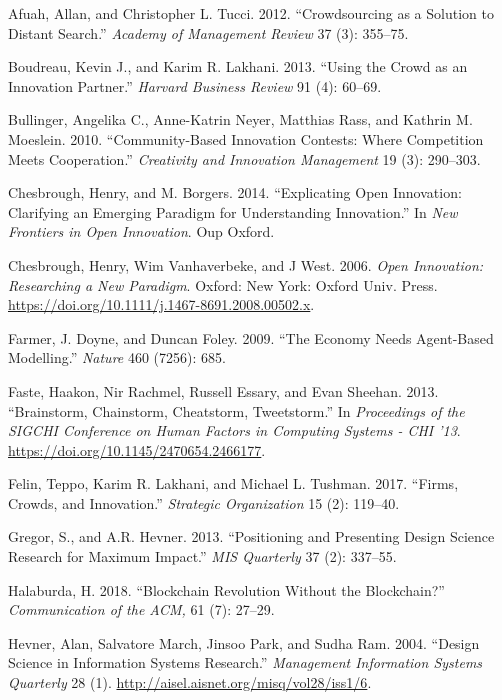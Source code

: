 \documentclass[]{elsarticle} %
\begin{document}
\hypertarget{refs}{}
\hypertarget{ref-afuah_crowdsourcing_2012}{}
Afuah, Allan, and Christopher L. Tucci. 2012. ``Crowdsourcing as a
Solution to Distant Search.'' \emph{Academy of Management Review} 37
(3): 355--75.

\hypertarget{ref-boudreau_using_2013}{}
Boudreau, Kevin J., and Karim R. Lakhani. 2013. ``Using the Crowd as an
Innovation Partner.'' \emph{Harvard Business Review} 91 (4): 60--69.

\hypertarget{ref-bullinger_community-based_2010-1}{}
Bullinger, Angelika C., Anne-Katrin Neyer, Matthias Rass, and Kathrin M.
Moeslein. 2010. ``Community-Based Innovation Contests: Where Competition
Meets Cooperation.'' \emph{Creativity and Innovation Management} 19 (3):
290--303.

\hypertarget{ref-chesbrough_explicating_2014}{}
Chesbrough, Henry, and M. Borgers. 2014. ``Explicating Open Innovation:
Clarifying an Emerging Paradigm for Understanding Innovation.'' In
\emph{New Frontiers in Open Innovation}. Oup Oxford.

\hypertarget{ref-chesbrough_open_2006}{}
Chesbrough, Henry, Wim Vanhaverbeke, and J West. 2006. \emph{Open
Innovation: Researching a New Paradigm}. Oxford: New York: Oxford Univ.
Press. \url{https://doi.org/10.1111/j.1467-8691.2008.00502.x}.

\hypertarget{ref-farmer_economy_2009}{}
Farmer, J. Doyne, and Duncan Foley. 2009. ``The Economy Needs
Agent-Based Modelling.'' \emph{Nature} 460 (7256): 685.

\hypertarget{ref-faste_brainstorm_2013}{}
Faste, Haakon, Nir Rachmel, Russell Essary, and Evan Sheehan. 2013.
``Brainstorm, Chainstorm, Cheatstorm, Tweetstorm.'' In \emph{Proceedings
of the SIGCHI Conference on Human Factors in Computing Systems - CHI
'13}. \url{https://doi.org/10.1145/2470654.2466177}.

\hypertarget{ref-felin_firms_2017}{}
Felin, Teppo, Karim R. Lakhani, and Michael L. Tushman. 2017. ``Firms,
Crowds, and Innovation.'' \emph{Strategic Organization} 15 (2): 119--40.

\hypertarget{ref-gregor_positioning_2013}{}
Gregor, S., and A.R. Hevner. 2013. ``Positioning and Presenting Design
Science Research for Maximum Impact.'' \emph{MIS Quarterly} 37 (2):
337--55.

\hypertarget{ref-halaburda_blockchain_2018}{}
Halaburda, H. 2018. ``Blockchain Revolution Without the Blockchain?''
\emph{Communication of the ACM,} 61 (7): 27--29.

\hypertarget{ref-hevner_design_2004}{}
Hevner, Alan, Salvatore March, Jinsoo Park, and Sudha Ram. 2004.
``Design Science in Information Systems Research.'' \emph{Management
Information Systems Quarterly} 28 (1).
\url{http://aisel.aisnet.org/misq/vol28/iss1/6}.
\end{document}

